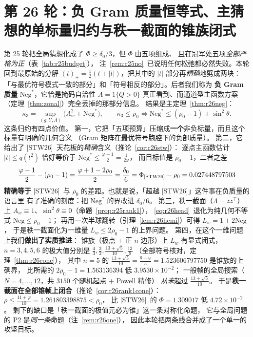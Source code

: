 \documentclass[UTF8,11pt]{ctexart}
\theoremstyle{definition}
\newcommand{\Lam}{\Lambda}
\newcommand{\STW}{\textup{[STW26]}}
\begin{document}
\section{第 26 轮：负 Gram 质量恒等式、主猜想的单标量归约与秩一截面的锥族闭式}\label{sec:r26}

第 25 轮把全局猜想化成了 $\Phi\ge\delta_0/3$，但 $\Phi$ 由五项组成、
且在冠军处五项\emph{全部严格为正}（表~\ref{tab:r25budget}），
注~\ref{rem:r25no}~已说明任何松弛都必然失败。本轮回到最原始的分解
$(t)_+=\frac12(t+|t|)$，把其中的 $|t|$-部分再\emph{精确}地劈成两块：
「与最优符号模式一致的部分」和「符号相反的部分」。后者我们称为
\textbf{负 Gram 质量} $\mathrm{Neg}^*$，它恰是掩码自洽性 $A=1\{Q>0\}$
真正看到、而通道型主函数方案（定理~\ref{thm:zonal}）完全丢掉的那部分信息。
结果是主定理~\ref{thm:r26neg}：
\begin{equation}\label{eq:r26head}
\kappa_3=\sup_{(g,U,\Lam)}\bigl(A_w^2+\mathrm{Neg}^*\bigr),
\qquad
\kappa_3\le\rho_0\iff
\mathrm{Neg}^*\le(\rho_0-1)+\sin^2\theta .
\end{equation}
这条归约有四点价值。
第一，它把「五项预算」压缩成\textbf{一个}非负标量，而且这个标量有明确的几何含义
（Gram 矩阵在最优符号胞腔下的负部质量）。
第二，它给出了 \STW\ 天花板的\emph{精确}含义（推论~\ref{cor:r26stw}）：
逐点主函数估计 $|t|\le q(t^2)$ 恰好等价于 $\mathrm{Neg}^*\le\frac{\varphi-1}2=\frac1{2\varphi}$，
而目标值是 $\rho_0-1$，二者之差
\[
\frac{\varphi-1}2-(\rho_0-1)=\frac{\varphi+1-2\rho_0}2=\frac{\delta_0}6
=\Phi_{\STW}-\rho_0=0.027448797503
\]
\textbf{精确等于} \STW\ 与 $\rho_0$ 的差距。也就是说，「超越 \STW」这件事在负质量的语言里
有了准确的刻度：把 $\mathrm{Neg}^*$ 的界改进 $\delta_0/6$。
第三，秩一截面（$\Lam=zz^\top$）上 $A_w\equiv1$、$\sin^2\theta\equiv0$（命题~\ref{prop:r25rank1}），
\eqref{eq:r26head}~退化为纯几何不等式 $\mathrm{Neg}\le\rho_0-1$；
再用一次半球翻转（引理~\ref{lem:r26hemi}）可得 $L_w=1+2\mathrm{Neg}$，
于是秩一截面化为一维量 $L_w\le2\rho_0-1$ 的上界问题。
第四，在这个一维问题上我们\textbf{做出了实质推进}：
锥族（极点 $+$ 正 $n$ 边形）上 $L_w$ 有显式闭式，
$n=3,4,5,6$ 的极大值分别是 $\frac43,\frac32,\frac{13+\sqrt5}{10},\frac{13}9$
（全部符号核对，定理~\ref{thm:r26cone}），
其中 $n=5$ 的 $\frac{13+\sqrt5}{10}=\frac{6+\varphi}5=1.523606797750$ 是锥族的上确界，
比所需的 $2\rho_0-1=1.563136394$ 低 $3.9530\times10^{-2}$；
一般帧的全局搜索（$N=4,\dots,12$，共 $3150$ 个随机起点 $+$ Powell 精修）
\emph{从未}超过 $\frac{13+\sqrt5}{10}$。
于是\textbf{秩一截面在全部锥帧上闭合}（推论~\ref{cor:r26rank1cone}）：
$\rho\le\frac{11+\varphi}{10}=1.261803398875<\rho_0$，
比 \STW\ 的 $\Phi=1.309017$ 低 $4.72\times10^{-2}$。
剩下的缺口是「秩一截面的极值元必为锥」这一条对称化命题，
它与全局问题的 P2 是\emph{同一条}命题（注~\ref{rem:r26one}），
因此本轮把两条线合并成了一个单一的攻坚目标。
\end{document}

